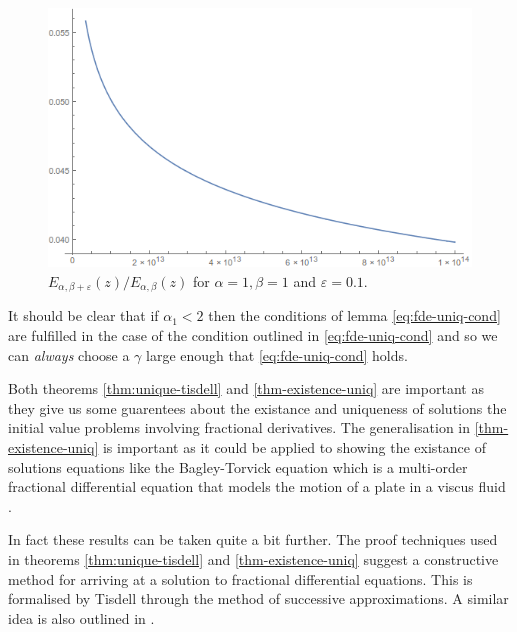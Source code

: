 \begin{figure}[H]
\includegraphics[scale=0.6]{images/Mittag-Leffler-Quotient}
\caption{$ E_{\alpha, \beta + \varepsilon}(z) / E_{\alpha, \beta}(z) $ for $ \alpha = 1, \beta = 1 $ and $ \varepsilon = 0.1 $.}
\label{fig:mittag-quotient}
\end{figure}

It should be clear that if $ \alpha_1 < 2 $ then the conditions of lemma \ref{eq:fde-uniq-cond} are fulfilled in the case of the condition outlined in \eqref{eq:fde-uniq-cond} and so we can \emph{always} choose a $ \gamma $ large enough that \eqref{eq:fde-uniq-cond} holds.


Both theorems \ref{thm:unique-tisdell} and \ref{thm-existence-uniq} are important as they give us some guarentees about the existance and uniqueness of solutions the initial value problems involving fractional derivatives. The generalisation in \ref{thm-existence-uniq} is important as it could be applied to showing the existance of solutions equations like the Bagley-Torvick equation which is a multi-order fractional differential equation that models the motion of a plate in a viscus fluid \cite{Diethelm2002-3, Podlubny1999, Torvik1984}.

In fact these results can be taken quite a bit further. The proof techniques used in theorems \ref{thm:unique-tisdell} and \ref{thm-existence-uniq} suggest a constructive method for arriving at a solution to fractional differential equations. This is formalised by Tisdell \cite{Tisdell2012} through the method of successive approximations. A similar idea is also outlined in \cite{Podlubny1999}.

\clearpage


